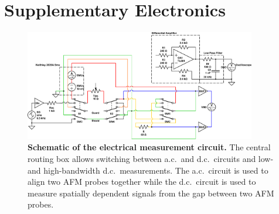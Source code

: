 \documentclass[12pt, a4paper, oneside]{book}
\begin{document}


\section{Supplementary Electronics}

\begin{figure}[b]
\centering
\includegraphics[width=0.9\textwidth]{figures/tip_experiment_circuit_design}
\caption[Schematic of the electrical measurement circuit.]{\textbf{Schematic of the electrical measurement circuit.} The central routing box allows switching between a.c.\ and d.c.\ circuits and low-and high-bandwidth d.c.\ measurements. The a.c.\ circuit is used to align two AFM probes together while the d.c.\ circuit is used to measure spatially dependent signals from the gap between two AFM probes.}
\label{fig:circuit_design}
\end{figure}
\end{document}
